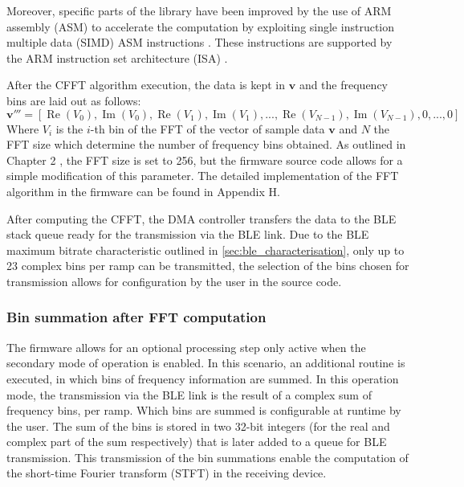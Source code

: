 Moreover, specific parts of the library have been improved by the use of ARM assembly (ASM) to accelerate the computation by exploiting single instruction multiple data (SIMD) ASM instructions \cite{ARMM4}. These instructions are supported by the ARM instruction set architecture (ISA) \cite{ARMM4}.

After the CFFT algorithm execution, the data is kept in $\mathbf{v}$ and the frequency bins are laid out as follows:
\begin{equation}
	\mathbf{v'''} = [\operatorname{Re}(V_0), \operatorname{Im}(V_0),\operatorname{Re}(V_1), \operatorname{Im}(V_1), ..., \operatorname{Re}(V_{N-1}), \operatorname{Im}(V_{N-1}),0,...,0]
\end{equation}
Where $V_i$ is the $i$-th bin of the FFT of the vector of sample data $\mathbf{v}$ and $N$ the FFT size which determine the number of frequency bins obtained. As outlined in Chapter 2 %
, the FFT size is set to 256, but the firmware source code allows for a simple modification of this parameter. The detailed implementation of the FFT algorithm in the firmware can be found in Appendix H. %

After computing the CFFT, the DMA controller transfers the data to the BLE stack queue ready for the transmission via the BLE link. Due to the BLE maximum bitrate characteristic outlined in \cref{sec:ble_characterisation}, only up to 23 complex bins per ramp can be transmitted, the selection of the bins chosen for transmission allows for configuration by the user in the source code.

\subsubsection{Bin summation after FFT computation}

The firmware allows for an optional processing step only active when the secondary mode of operation is enabled. In this scenario, an additional routine is executed, in which bins of frequency information are summed. In this operation mode, the transmission via the BLE link is the result of a complex sum of frequency bins, per ramp. Which bins are summed is configurable at runtime by the user. The sum of the bins is stored in two 32-bit integers (for the real and complex part of the sum respectively) that is later added to a queue for BLE transmission. This transmission of the bin summations enable the computation of the short-time Fourier transform (STFT) in the receiving device.


